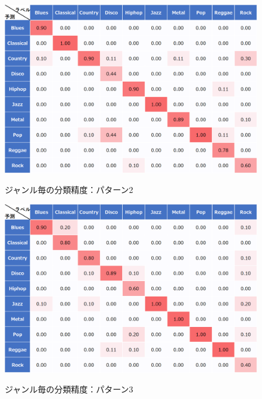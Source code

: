 \begin{figure}[htbp]
	\begin{center}
		\includegraphics[scale=0.5]{./images/classify-model/mel2_matrix.png}
		\caption{ジャンル毎の分類精度：パターン2}
		\label{fig:CNN2}
		\vspace{50pt}
		\includegraphics[scale=0.5]{./images/classify-model/mel3_matrix.png}
		\caption{ジャンル毎の分類精度：パターン3}
		\label{fig:CNN3}
	\end{center}
\end{figure}
\newpage
